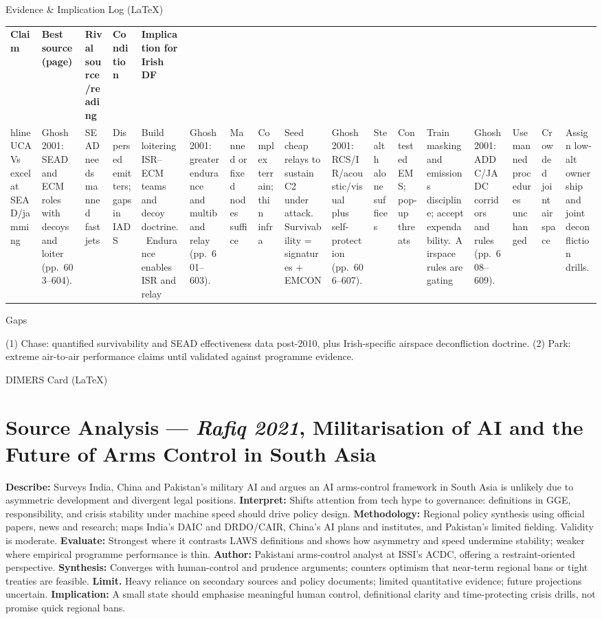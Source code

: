 Evidence & Implication Log (LaTeX)

\usepackage{array}
\begin{tabular}{p{3.2cm}p{4.2cm}p{3.6cm}p{3.2cm}p{4.2cm}}
	\textbf{Claim} & \textbf{Best source (page)} & \textbf{Rival source/reading} & \textbf{Condition} & \textbf{Implication for Irish DF}\\hline
	UCAVs excel at SEAD/jamming & Ghosh 2001: SEAD and ECM roles with decoys and loiter (pp.~603–604). & SEAD needs manned fast jets & Dispersed emitters; gaps in IADS & Build loitering ISR–ECM teams and decoy doctrine.\
	Endurance enables ISR and relay & Ghosh 2001: greater endurance and multiband relay (pp.~601–603). & Manned or fixed nodes suffice & Complex terrain; thin infra & Seed cheap relays to sustain C2 under attack.\
	Survivability = signatures + EMCON & Ghosh 2001: RCS/IR/acoustic/visual plus self-protection (pp.~606–607). & Stealth alone suffices & Contested EMS; pop-up threats & Train masking and emissions discipline; accept expendability.\
	Airspace rules are gating & Ghosh 2001: ADDC/JADC corridors and rules (pp.~608–609). & Use manned procedures unchanged & Crowded joint airspace & Assign low-alt ownership and joint deconfliction drills.\
\end{tabular}

Gaps

(1) Chase: quantified survivability and SEAD effectiveness data post-2010, plus Irish-specific airspace deconfliction doctrine.
(2) Park: extreme air-to-air performance claims until validated against programme evidence.

\parencite{RAFIQ_2021}
DIMERS Card (LaTeX)

\section*{Source Analysis — \textit{Rafiq 2021}, Militarisation of AI and the Future of Arms Control in South Asia}
\textbf{Describe:} Surveys India, China and Pakistan’s military AI and argues an AI arms-control framework in South Asia is unlikely due to asymmetric development and divergent legal positions.
\textbf{Interpret:} Shifts attention from tech hype to governance: definitions in GGE, responsibility, and crisis stability under machine speed should drive policy design.
\textbf{Methodology:} Regional policy synthesis using official papers, news and research; maps India’s DAIC and DRDO/CAIR, China’s AI plans and institutes, and Pakistan’s limited fielding. Validity is moderate.
\textbf{Evaluate:} Strongest where it contrasts LAWS definitions and shows how asymmetry and speed undermine stability; weaker where empirical programme performance is thin.
\textbf{Author:} Pakistani arms-control analyst at ISSI’s ACDC, offering a restraint-oriented perspective.
\textbf{Synthesis:} Converges with human-control and prudence arguments; counters optimism that near-term regional bans or tight treaties are feasible.
\textbf{Limit.} Heavy reliance on secondary sources and policy documents; limited quantitative evidence; future projections uncertain.
\textbf{Implication:} A small state should emphasise meaningful human control, definitional clarity and time-protecting crisis drills, not promise quick regional bans.

